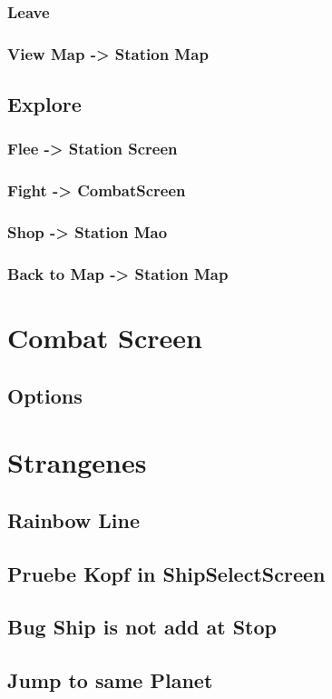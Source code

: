 \documentclass[11pt]{article}
\begin{document}
\subsubsection{Leave}
\subsubsection{View Map -> Station Map}

\subsection{Explore}
\subsubsection{Flee -> Station Screen}
\subsubsection{Fight -> CombatScreen}
\subsubsection{Shop -> Station Mao}
\subsubsection{Back to Map -> Station Map}


\section{Combat Screen}
\label{sec:org9c941a6}
\subsection{Options}



\section{Strangenes}
\label{sec:org4b85c14}
\subsection{Rainbow Line}
\subsection{Pruebe Kopf in ShipSelectScreen}
\subsection{Bug Ship is not add at Stop}
\subsection{Jump to same Planet}
\end{document}
